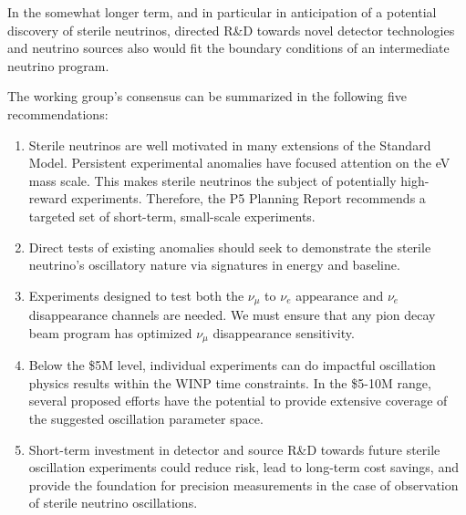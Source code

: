 In the somewhat longer term, and in particular in anticipation of a potential discovery of sterile neutrinos, directed R\&D towards novel detector technologies and neutrino sources also would fit the boundary conditions of an intermediate neutrino program. 

The working group's consensus can be summarized in the following five recommendations:

\begin{enumerate}
\item{Sterile neutrinos are well motivated in many extensions of the Standard Model.   Persistent experimental anomalies have focused attention on the eV mass scale.  This makes sterile neutrinos the subject of potentially high-reward experiments.  Therefore, the P5 Planning Report recommends a targeted set of short-term, small-scale experiments.}
\item{Direct tests of existing anomalies should seek to demonstrate the sterile neutrino's oscillatory nature via signatures in energy and baseline.}
\item{Experiments designed to test both the $\nu_{\mu}$ to $\nu_e$ appearance and $\nu_e$ disappearance channels are needed.  We must ensure that any pion decay beam program has optimized $\nu_{\mu}$ disappearance sensitivity.}
\item{Below the \$5M level, individual experiments can do impactful oscillation physics results within the WINP time constraints.  In the \$5-10M range, several proposed efforts have the potential to provide extensive coverage of the suggested oscillation parameter space.}
\item{Short-term investment in detector and source R\&D towards future sterile oscillation experiments could reduce risk, lead to long-term cost savings, and provide the foundation for precision measurements in the case of observation of sterile neutrino oscillations.}
\end{enumerate}
